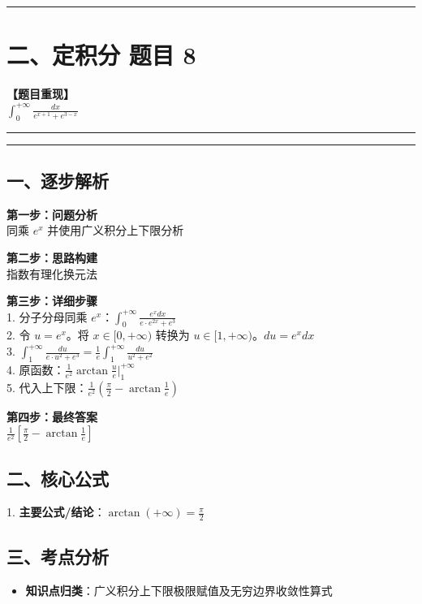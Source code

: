 ﻿\documentclass[12pt, a4paper]{ctexart}
\newcommand{\TopSeparator}{
    \par\noindent\rule{\textwidth}{1.5pt}\vspace{0.5em}
}
\newcommand{\AnalysisSeparator}{
    \par\noindent\rule{\textwidth}{0.5pt}\vspace{0.2em}\hrule\vspace{0.5em}
}
\newenvironment{RedAnalysis}{
    \par
    \color{red} 
}{
    \par
    \color{black} 
}
\begin{document}
\vspace{2em}

\TopSeparator
\section*{二、定积分 题目 8}

\textbf{【题目重现】} \\
$\int_{0}^{+\infty} \frac{dx}{e^{x+1}+e^{3-x}}$

\AnalysisSeparator

\begin{RedAnalysis}

	\subsection*{一、逐步解析}

	\textbf{第一步：问题分析} \\
	同乘 $e^x$ 并使用广义积分上下限分析

	\textbf{第二步：思路构建} \\
	指数有理化换元法

	\textbf{第三步：详细步骤} \\
	1. 分子分母同乘 $e^x$：$\int_0^{+\infty} \frac{e^x dx}{e \cdot e^{2x} + e^3}$ \\ 
	2. 令 $u = e^x$。将 $x \in [0, +\infty)$ 转换为 $u \in [1, +\infty)$。$du = e^x dx$ \\ 
	3. $\int_1^{+\infty} \frac{du}{e \cdot u^2 + e^3} = \frac{1}{e} \int_1^{+\infty} \frac{du}{u^2 + e^2}$ \\ 
	4. 原函数：$\frac{1}{e^2} \arctan\frac{u}{e} \Big|_1^{+\infty}$ \\ 
	5. 代入上下限：$\frac{1}{e^2} (\frac{\pi}{2} - \arctan\frac{1}{e})$

	\textbf{第四步：最终答案} \\
	$\frac{1}{e^2} \left[ \frac{\pi}{2} - \arctan\frac{1}{e} \right]$

	\subsection*{二、核心公式}
	1. \textbf{主要公式/结论}：$\arctan(+\infty) = \frac{\pi}{2}$

	\subsection*{三、考点分析}
	\begin{itemize}
		\item \textbf{知识点归类}：广义积分上下限极限赋值及无穷边界收敛性算式
	\end{itemize}

\end{RedAnalysis}
\end{document}
